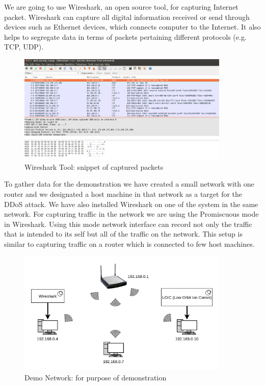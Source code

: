 \documentclass[10pt,oneside,a4paper]{article}
\begin{document}
We are going to use Wireshark, an open source tool, for capturing Internet packet. Wireshark can capture all digital information received or send through devices such as Ethernet devices, which connects computer to the Internet. It also helps to segregate data in terms of packets pertaining different protocols (e.g. TCP, UDP).\par

\begin{figure}[H]
\centering
\includegraphics[width=0.90\textwidth]{Wireshark_Tools.png}
\caption{Wireshark Tool: snippet of captured packets} \label{fig:wireshark}
\end{figure}

To gather data for the demonstration we have created a small network with one router and we designated a host machine in that network as a target for the DDoS attack. We have also installed Wireshark on one of the system in the same network. For capturing traffic in the network we are using the Promiscuous mode in Wireshark. Using this mode network interface can record not only the traffic that is intended to its self but all of the traffic on the network. This setup is similar to capturing traffic on a router which is connected to few host machines.

\begin{figure}[H]
\centering
\includegraphics[width=0.90\textwidth]{demo_network}
\caption{Demo Network: for purpose of demonstration} \label{fig:demonetwork}
\end{figure}
\end{document}
